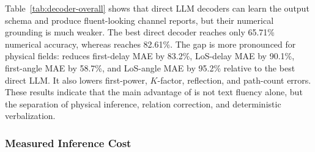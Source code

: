 \begin{table}[H]
\vspace{3pt}
\label{tab:decoder-fields}
\end{table}

Table~\ref{tab:decoder-overall} shows that direct LLM decoders can learn the output schema and produce
fluent-looking channel reports, but their numerical grounding is much weaker. The best direct decoder
reaches only 65.71\% numerical accuracy, whereas \model{} reaches 82.61\%. The gap is more pronounced
for physical fields: \model{} reduces first-delay MAE by 83.2\%, LoS-delay MAE by 90.1\%, first-angle
MAE by 58.7\%, and LoS-angle MAE by 95.2\% relative to the best direct LLM. It also lowers first-power,
$K$-factor, reflection, and path-count errors. These results indicate that the main advantage of
\model{} is not text fluency alone, but the separation of physical inference, relation correction, and
deterministic verbalization.

\subsubsection{Measured Inference Cost}

